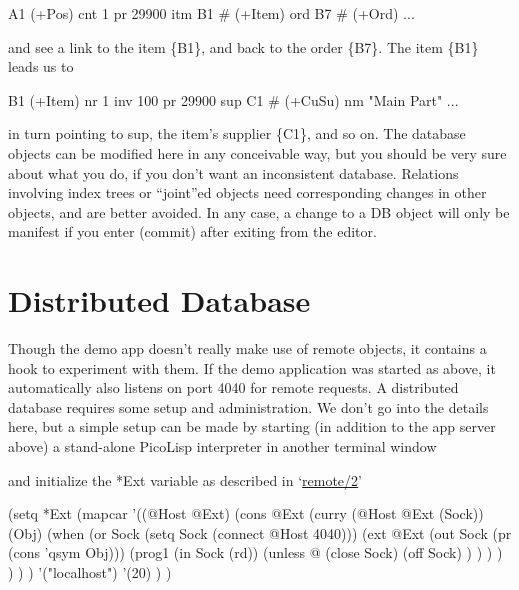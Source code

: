 \begin{wideverbatim}
{A1} (+Pos)
   cnt 1
   pr 29900
   itm {B1}  # (+Item)
   ord {B7}  # (+Ord)
...
\end{wideverbatim}

and see a link to the item \{B1\}, and back to the order \{B7\}.
 The item \{B1\} leads us to


\begin{wideverbatim}
{B1} (+Item)
   nr 1
   inv 100
   pr 29900
   sup {C1}  # (+CuSu)
   nm "Main Part"
   ...
\end{wideverbatim}

in turn pointing to sup, the item's supplier \{C1\}, and so on.
 The database objects can be modified here in any conceivable way, but
you should be very sure about what you do, if you don't want an
inconsistent database. Relations involving index trees or ``joint''ed
objects need corresponding changes in other objects, and are better
avoided. In any case, a change to a DB object will only be manifest if
you enter (commit) after exiting from the editor.

\section{Distributed Database}
\label{sec:edit-distributed-database}


Though the demo app doesn't really make use of remote objects, it
contains a hook to experiment with them. If the demo application was
started as above, it automatically also listens on port 4040 for remote
requests.
 A distributed database requires some setup and administration. We don't
go into the details here, but a simple setup can be made by starting (in
addition to the app server above) a stand-alone PicoLisp interpreter in
another terminal window



and initialize the *Ext variable as described in
`\href{http://software-lab.de/doc/refR.html#remote/2}{remote/2}'


\begin{wideverbatim}
(setq *Ext
   (mapcar
      '((@Host @Ext)
         (cons @Ext
            (curry (@Host @Ext (Sock)) (Obj)
               (when (or Sock (setq Sock (connect @Host 4040)))
                  (ext @Ext
                     (out Sock (pr (cons 'qsym Obj)))
                     (prog1 (in Sock (rd))
                        (unless @
                           (close Sock)
                           (off Sock) ) ) ) ) ) ) )
      '("localhost")
      '(20) ) )
\end{wideverbatim}

